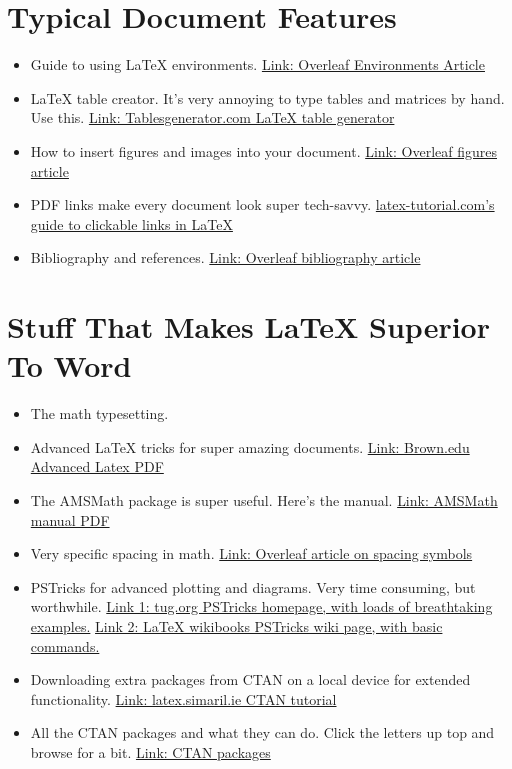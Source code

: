 \documentclass{article}
\newcommand{\latex}{\LaTeX \xspace}
\begin{document}
\section{Typical Document Features}
\begin{itemize}
    \item Guide to using \latex environments. \href{https://www.overleaf.com/learn/latex/Environments}{Link: Overleaf Environments Article}
    \item \latex table creator. It's very annoying to type tables and matrices by hand. Use this. \href{https://www.tablesgenerator.com/}{Link: Tablesgenerator.com \latex table generator}
    \item How to insert figures and images into your document. \href{https://www.overleaf.com/learn/latex/Inserting_Images}{Link: Overleaf figures article}
    \item PDF links make every document look super tech-savvy. \href{https://www.latex-tutorial.com/tutorials/hyperlinks/}{latex-tutorial.com's guide to clickable links in LaTeX}
    \item Bibliography and references. \href{https://www.overleaf.com/learn/latex/bibliography_management_with_bibtex}{Link: Overleaf bibliography article}
\end{itemize}

\section{Stuff That Makes \latex Superior To Word}
\begin{itemize}
    \item The math typesetting.
    \item Advanced \latex tricks for super amazing documents. \href{https://www.brown.edu/academics/science-center/sites/brown.edu.academics.science-center/files/uploads/advancedLaTeX_0.pdf}{Link: Brown.edu Advanced Latex PDF}
    \item The AMSMath package is super useful. Here's the manual. \href{http://mirrors.rit.edu/CTAN/macros/latex/required/amsmath/amsldoc.pdf}{Link: AMSMath manual PDF}
    \item Very specific spacing in math. \href{https://www.overleaf.com/learn/latex/Spacing_in_math_mode}{Link: Overleaf article on spacing symbols}
    \item PSTricks for advanced plotting and diagrams. Very time consuming, but worthwhile. \href{https://tug.org/PSTricks/main.cgi/}{Link 1: tug.org PSTricks homepage, with loads of breathtaking examples.} \href{https://en.wikibooks.org/wiki/LaTeX/PSTricks}{Link 2: \latex wikibooks PSTricks wiki page, with basic commands.}
    \item Downloading extra packages from CTAN on a local device for extended functionality. \href{http://latex.silmaril.ie/formattinginformation/pkginst.html}{Link: latex.simaril.ie CTAN tutorial}
    \item All the CTAN packages and what they can do. Click the letters up top and browse for a bit. \href{https://ctan.org/pkg/}{Link: CTAN packages}
    
\end{itemize}
\end{document}
